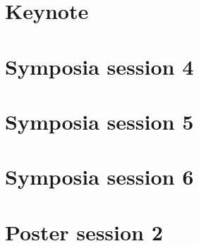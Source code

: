 
\section{Keynote}


\newpage

\section{Symposia session 4}

\newpage

\section{Symposia session 5}


\newpage

\section{Symposia session 6}

\newpage

\section{Poster session 2}


\newpage